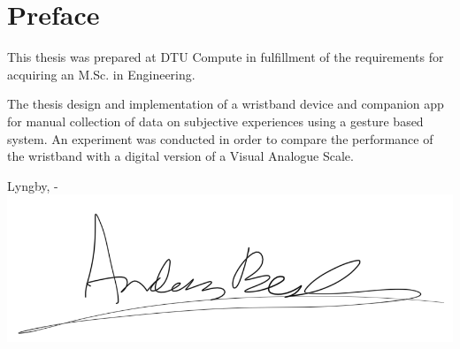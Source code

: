 \chapter{Preface}

This thesis was prepared at DTU Compute in fulfillment of the requirements for acquiring an M.Sc. in Engineering.

The thesis design and implementation of a wristband device and companion app for manual collection of data on subjective experiences using a gesture based system. An experiment was conducted in order to compare the performance of the wristband with a digital version of a Visual Analogue Scale.

\vspace{20mm}
\begin{center}
    \hspace{20mm} Lyngby, \thesishandin-\thesisyear
    \vspace{5mm}
    \newline
    \includegraphics[scale=0.3]{Signature.png}
\end{center}
\begin{flushright}
    \thesisauthor
\end{flushright}
